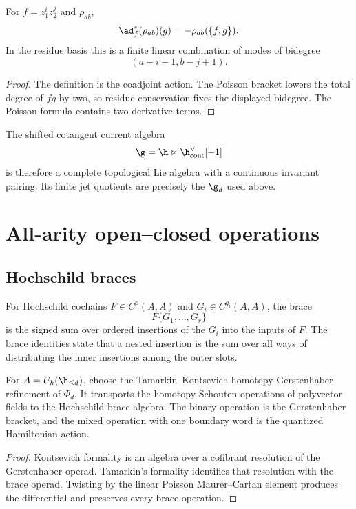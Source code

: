 \begin{proposition}
For $f=z_1^iz_2^j$ and $\rho_{ab}$,
\[
 \ad_f^*(\rho_{ab})(g)
 =-\rho_{ab}(\{f,g\}).
\]
In the residue basis this is a finite linear combination of modes of bidegree
\[
 (a-i+1,b-j+1).
\]
\end{proposition}
\begin{proof}
The definition is the coadjoint action.  The Poisson bracket lowers the total degree of $fg$ by two, so residue conservation fixes the displayed bidegree.  The Poisson formula contains two derivative terms.
\end{proof}

The shifted cotangent current algebra
\[
 \g=\h\ltimes\h^\vee_{\mathrm{cont}}[-1]
\]
is therefore a complete topological Lie algebra with a continuous invariant pairing.  Its finite jet quotients are precisely the $\g_d$ used above.

\chapter{All-arity open--closed operations}
\section{Hochschild braces}
For Hochschild cochains $F\in C^p(A,A)$ and $G_i\in C^{q_i}(A,A)$, the brace
\[
 F\{G_1,\ldots,G_r\}
\]
is the signed sum over ordered insertions of the $G_i$ into the inputs of $F$.  The brace identities state that a nested insertion is the sum over all ways of distributing the inner insertions among the outer slots.

\begin{theorem}
For $A=U_\hbar(\h_{\le d})$, choose the Tamarkin--Kontsevich homotopy-Gerstenhaber refinement of $\Phi_d$.  It transports the homotopy Schouten operations of polyvector fields to the Hochschild brace algebra.  The binary operation is the Gerstenhaber bracket, and the mixed operation with one boundary word is the quantized Hamiltonian action.
\end{theorem}
\begin{proof}
Kontsevich formality is an algebra over a cofibrant resolution of the Gerstenhaber operad.  Tamarkin's formality identifies that resolution with the brace operad.  Twisting by the linear Poisson Maurer--Cartan element produces the differential and preserves every brace operation.
\end{proof}


